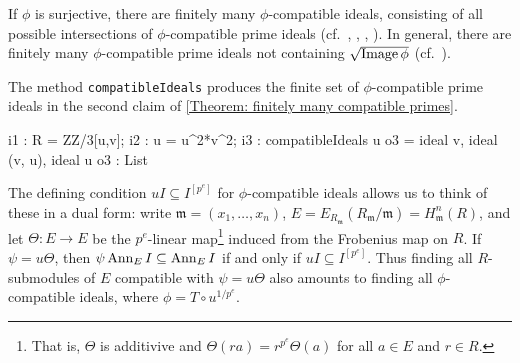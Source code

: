 \documentclass{amsart}
\begin{document}
\begin{theorem}\label{Theorem: finitely many compatible primes}
If $\phi$ is surjective, there are finitely many $\phi$-compatible ideals, consisting of all possible intersections
of $\phi$-compatible prime ideals \textup(cf.\ \cite{KumarMehtaFiniteness}, \cite{SchwedeFAdjunction},
\cite{SharpGradedAnnihilatorsOfModulesOverTheFrobeniusSkewPolynomialRing}, \cite{EnescuHochsterTheFrobeniusStructureOfLocalCohomology}\textup).
In general, there are finitely many $\phi$-compatible prime ideals not containing $\sqrt{\operatorname{Image} \phi}$ \textup(cf.\ \cite{KatzmanSchwedeAlgorithm}\textup).

\end{theorem}

The method \texttt{compatibleIdeals} produces the finite set of $\phi$-compatible prime ideals in the second claim of \autoref{Theorem: finitely many compatible primes}.

\medskip
{\small
\begin{MyVerbatim}
i1 : R = ZZ/3[u,v];
i2 : u = u^2*v^2;
i3 : compatibleIdeals u
o3 = {ideal v, ideal (v, u), ideal u}
o3 : List
\end{MyVerbatim}
}\medskip

The defining condition $u I \subseteq I^{[p^e]}$ for $\phi$-compatible ideals allows us to
think of these in a dual form: write $\mathfrak{m}=(x_1, \dots, x_n)$,
$E=E_{R_\mathfrak{m}}(R_{\mathfrak{m}}/\mathfrak{m})=H^n_{\mathfrak{m}} (R)$, and let
$\Theta: E \rightarrow E$ be the $p^e$-linear map\footnote{That is, $\Theta$ is additivive and $\Theta (r a)= r^{p^e} \Theta (a)$ for all $a\in E$ and $r\in R$.}
induced from the Frobenius map on $R$.
If $\psi=u \Theta$, then $\psi \operatorname{{Ann}}_E I \subseteq \operatorname{{Ann}}_E I$ if and only if $u I \subseteq  I^{[p^e]}$.
Thus finding all $R$-submodules of $E$ compatible with $\psi=u \Theta$ also amounts to finding all
$\phi$-compatible ideals, where $\phi=T \circ u^{1/p^e}$.
\end{document}
